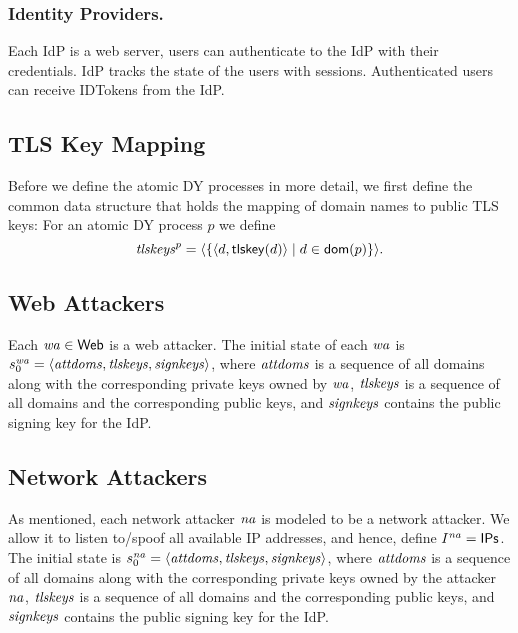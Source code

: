 \documentclass[letterpaper,onecolumn,10pt]{article}
\begin{document}
\subsubsection{Identity Providers.} Each IdP is a web server, 
users can authenticate to the IdP with their credentials. 
IdP tracks the state of the users with sessions. 
Authenticated users can receive IDTokens from the IdP. 


\subsection{TLS Key Mapping}\label{app:common-data-structures}
Before we define the atomic DY processes in more detail, we first
define the common data structure that holds the mapping of domain
names to public TLS keys: For an atomic DY process $p$ we define
\[\mathit{tlskeys}^p = \langle\left\{\langle d, \mathsf{tlskey}(d)\rangle \mid d \in \mathsf{dom}(p)\right\}\rangle.\]

\subsection{Web Attackers}\label{app:webattackers-uppresso}
Each $\mathit{wa} \in \mathsf{Web}$ is a web attacker. 
The initial state of each $\mathit{wa}$ is 
$s_0^{\mathit{wa}} = \langle\mathit{attdoms}, \mathit{tlskeys}, \mathit{signkeys}\rangle$, 
where $\mathit{attdoms}$ is a sequence of all domains along with 
the corresponding private keys owned by $\mathit{wa}$, 
$\mathit{tlskeys}$ is a sequence of all domains and 
the corresponding public keys, and 
$\mathit{signkeys}$ contains the public signing key for the IdP. 

\subsection{Network Attackers}\label{app:networkattackers-uppresso}
As mentioned, each network attacker $\mathit{na}$ is modeled to 
be a network attacker. We allow it to listen to/spoof all 
available IP addresses, and hence, define 
$I^{\mathit{na}} = \mathsf{IPs}$. 
The initial state is $s_0^{\mathit{na}} = 
\langle\mathit{attdoms}, \mathit{tlskeys}, \mathit{signkeys}\rangle$, 
where $\mathit{attdoms}$ is a sequence of all domains along with 
the corresponding private keys owned by the attacker 
$\mathit{na}$, $\mathit{tlskeys}$ is a sequence of all domains 
and the corresponding public keys, and 
$\mathit{signkeys}$ contains the public signing key for the IdP. 
\end{document}
